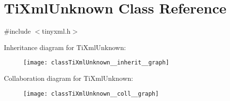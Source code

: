 \hypertarget{classTiXmlUnknown}{}\section{Ti\+Xml\+Unknown Class Reference}
\label{classTiXmlUnknown}


{\ttfamily \#include $<$tinyxml.\+h$>$}



Inheritance diagram for Ti\+Xml\+Unknown\+:\nopagebreak
\begin{figure}[H]
\begin{center}
\leavevmode
\texttt{[image: classTiXmlUnknown\_\_inherit\_\_graph]}
\end{center}
\end{figure}


Collaboration diagram for Ti\+Xml\+Unknown\+:\nopagebreak
\begin{figure}[H]
\begin{center}
\leavevmode
\texttt{[image: classTiXmlUnknown\_\_coll\_\_graph]}
\end{center}
\end{figure}
